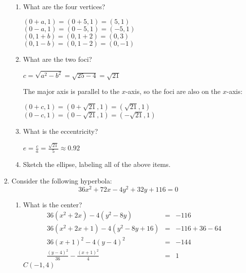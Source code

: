 \documentclass[letterpaper,12pt,fleqn]{article}
\begin{document}
\begin{enumerate}
\begin{enumerate}
  \item What are the four vertices?

    $(0+a,1)=(0+5,1)=(5,1)$ \\
    $(0-a,1)=(0-5,1)=(-5,1)$ \\
    $(0,1+b)=(0,1+2)=(0,3)$ \\
    $(0,1-b)=(0,1-2)=(0,-1)$
    
  \item What are the two foci?

    $c=\sqrt{a^2-b^2}=\sqrt{25-4}=\sqrt{21}$

    The major axis is parallel to the $x$-axis, so the foci are also on the
    $x$-axis:

    $(0+c,1)=(0+\sqrt{21},1)=(\sqrt{21},1)$ \\
    $(0-c,1)=(0-\sqrt{21},1)=(-\sqrt{21},1)$

  \item What is the eccentricity?

    $e=\frac{c}{a}=\frac{\sqrt{21}}{5}\approx0.92$
    
  \item Sketch the ellipse, labeling all of the above items.

  \end{enumerate}
\newpage
\item Consider the following hyperbola:
  \[36x^2+72x-4y^2+32y+116=0\]
  \begin{enumerate}
  \item What is the center?
    \begin{eqnarray*}
      36(x^2+2x)-4(y^2-8y) &=& -116 \\
      36(x^2+2x+1)-4(y^2-8y+16) &=& -116+36-64 \\
      36(x+1)^2-4(y-4)^2 &=& -144 \\
      \frac{(y-4)^2}{36}-\frac{(x+1)^2}{4} &=& 1
    \end{eqnarray*}
    $C(-1,4)$
    

\end{enumerate}
\end{enumerate}
\end{document}
